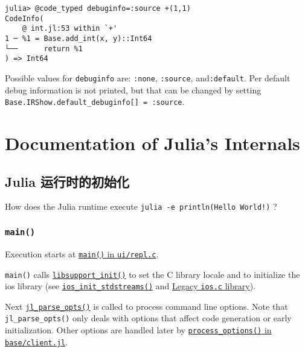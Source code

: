 \begin{lstlisting}
julia> @code_typed debuginfo=:source +(1,1)
CodeInfo(
    @ int.jl:53 within `+'
1 ─ %1 = Base.add_int(x, y)::Int64
└──      return %1
) => Int64
\end{lstlisting}



Possible values for \texttt{debuginfo} are: \texttt{:none}, \texttt{:source}, and\texttt{:default}. Per default debug information is not printed, but that can be changed by setting \texttt{Base.IRShow.default\_debuginfo[] = :source}.



\chapter{Documentation of Julia's Internals}


\hypertarget{4805065256470472206}{}


\section{Julia 运行时的初始化}



How does the Julia runtime execute \texttt{julia -e {\textquotesingle}println({\textquotedbl}Hello World!{\textquotedbl}){\textquotesingle}} ?



\hypertarget{6651980781302015874}{}


\subsection{\texttt{main()}}



Execution starts at \href{https://github.com/JuliaLang/julia/blob/master/ui/repl.c}{\texttt{main()} in \texttt{ui/repl.c}}.



\texttt{main()} calls \href{https://github.com/JuliaLang/julia/blob/master/src/support/libsupportinit.c}{\texttt{libsupport\_init()}} to set the C library locale and to initialize the {\textquotedbl}ios{\textquotedbl} library (see \href{https://github.com/JuliaLang/julia/blob/master/src/support/ios.c}{\texttt{ios\_init\_stdstreams()}} and \hyperlink{3841537160196121279}{Legacy \texttt{ios.c} library}).



Next \href{https://github.com/JuliaLang/julia/blob/master/src/jloptions.c}{\texttt{jl\_parse\_opts()}} is called to process command line options. Note that \texttt{jl\_parse\_opts()} only deals with options that affect code generation or early initialization. Other options are handled later by \href{https://github.com/JuliaLang/julia/blob/master/base/client.jl}{\texttt{process\_options()} in \texttt{base/client.jl}}.



